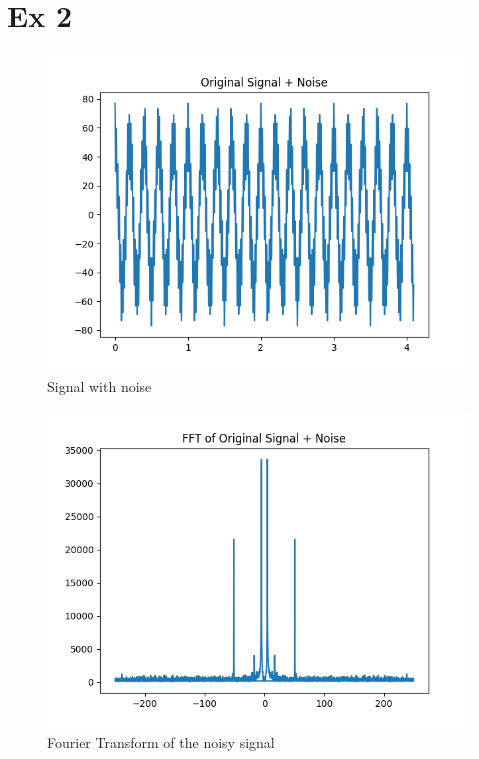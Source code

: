 \documentclass{article}
\begin{document}
\section{Ex 2}
\begin{figure}[H]
    \includegraphics[width=\textwidth]{HW2_2time.png}
    \caption{Signal with noise}
\end{figure}
\begin{figure}[H]
    \includegraphics[width=\textwidth]{HW2_2freq.png}
    \caption{Fourier Transform of the noisy signal}
\end{figure}
\end{document}
